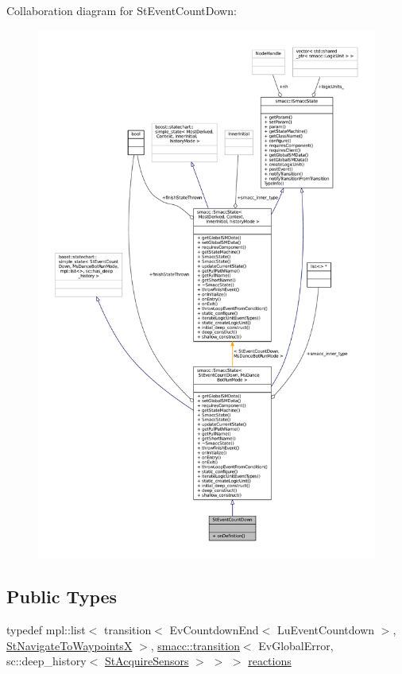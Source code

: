 Collaboration diagram for St\+Event\+Count\+Down\+:
\nopagebreak
\begin{figure}[H]
\begin{center}
\leavevmode
\includegraphics[width=350pt]{structStEventCountDown__coll__graph}
\end{center}
\end{figure}
\subsection*{Public Types}
\begin{DoxyCompactItemize}
\item 
typedef mpl\+::list$<$ transition$<$ Ev\+Countdown\+End$<$ Lu\+Event\+Countdown $>$, \hyperlink{structStNavigateToWaypointsX}{St\+Navigate\+To\+WaypointsX} $>$, \hyperlink{classsmacc_1_1transition}{smacc\+::transition}$<$ Ev\+Global\+Error, sc\+::deep\+\_\+history$<$ \hyperlink{structStAcquireSensors}{St\+Acquire\+Sensors} $>$ $>$ $>$ \hyperlink{structStEventCountDown_a6cbed99d43a19cad677e33c60f4cfdfc}{reactions}
\end{DoxyCompactItemize}
